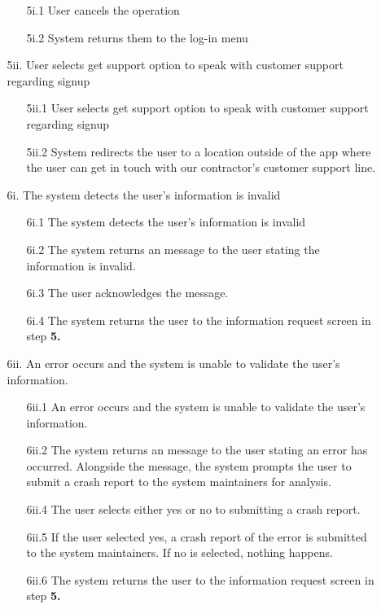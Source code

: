 \documentclass[]{article}
\begin{document}
\begin{enumerate}[label={\bf BE\arabic*.}]
\begin{enumerate}
			\begin{enumerate}
				\item[5i.1] User cancels the operation
				\item[5i.2] System returns them to the log-in menu
			\end{enumerate}						
			\item[5ii.] User selects get support option to speak with customer support regarding signup
			\begin{enumerate}
				\item[5ii.1] User selects get support option to speak with customer support regarding signup
				\item[5ii.2] System redirects the user to a location outside of the app where the user can get in touch with our contractor's customer support line.
			\end{enumerate}													\item[6i.] The system detects the user's information is invalid
			\begin{enumerate}
				\item[6i.1] The system detects the user's information is invalid
				\item[6i.2] The system returns an message to the user stating the information is invalid.
				\item[6i.3] The user acknowledges the message.
				\item[6i.4] The system returns the user to the information request screen in step \textbf{5.}				 							\end{enumerate}
			\item[6ii.] An error occurs and the system is unable to validate the user's information.
			\begin{enumerate}
				\item[6ii.1] An error occurs and the system is unable to validate the user's information.
				\item[6ii.2] The system returns an message to the user stating an error has occurred. Alongside the message, the system prompts the user to submit a crash report to the system maintainers for analysis.
				\item[6ii.4] The user selects either yes or no to submitting a crash report.
				\item[6ii.5] If the user selected yes, a crash report of the error is submitted to the system maintainers. If no is selected, nothing happens.
				\item[6ii.6] The system returns the user to the information request screen in step \textbf{5.}

\end{enumerate}
\end{enumerate}
\end{enumerate}
\end{document}
